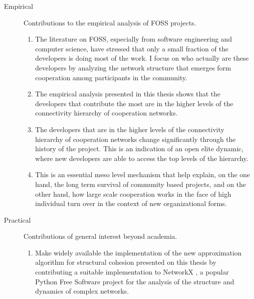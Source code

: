 \begin{description}
\begin{enumerate}
\end{enumerate}

\item[Empirical] Contributions to the empirical analysis of FOSS projects. 

\begin{enumerate}

\item The literature on FOSS, especially from software engineering and computer science, have stressed that only a small fraction of the developers is doing most of the work. I focus on who actually are these developers by analyzing the network structure that emerges form cooperation among participants in the community. 

\item The empirical analysis presented in this thesis shows that the developers that contribute the most are in the higher levels of the connectivity hierarchy of cooperation networks.

\item The developers that are in the higher levels of the connectivity hierarchy of cooperation networks change significantly through the history of the project. This is an indication of an open elite dynamic, where new developers are able to access the top levels of the hierarchy.

\item This is an essential meso level mechanism that help explain, on the one hand, the long term survival of community based projects, and on the other hand, how large scale cooperation works in the face of high individual turn over in the context of new organizational forms.

\end{enumerate}

\item[Practical] Contributions of general interest beyond academia.

\begin{enumerate}

\item Make widely available the implementation of the new approximation algorithm for structural cohesion presented on this thesis by contributing a suitable implementation to NetworkX \citep{hagberg:2008}, a popular Python Free Software project for the analysis of the structure and dynamics of complex networks.

\end{enumerate}

\end{description}

